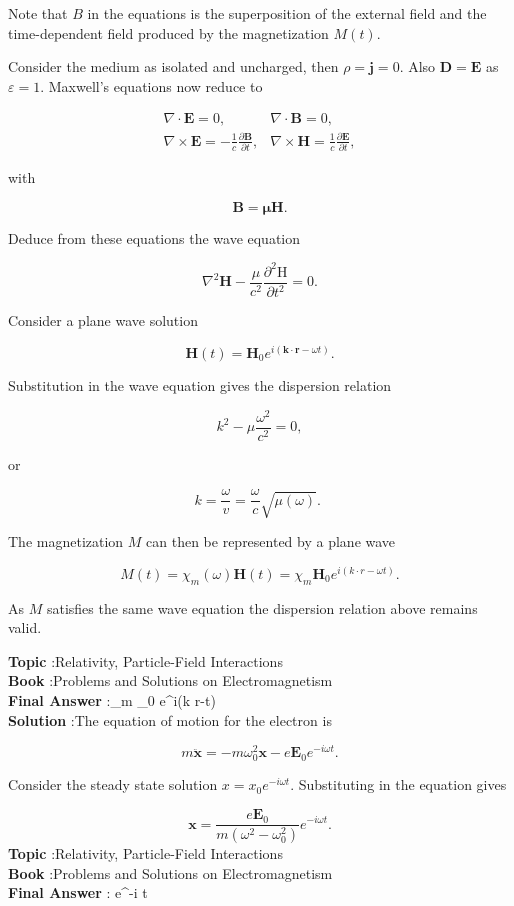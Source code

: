 \documentclass[10pt]{article}
\begin{document}
Note that $B$ in the equations is the superposition of the external field and the time-dependent field produced by the magnetization $M(t)$.

Consider the medium as isolated and uncharged, then $\rho=\mathbf{j}=0$. Also $\mathbf{D}=\mathbf{E}$ as $\varepsilon=1$. Maxwell's equations now reduce to

$$
\begin{array}{ll}
\nabla \cdot \mathbf{E}=0, & \nabla \cdot \mathbf{B}=0, \\
\nabla \times \mathbf{E}=-\frac{1}{c} \frac{\partial \mathbf{B}}{\partial t}, & \nabla \times \mathbf{H}=\frac{1}{c} \frac{\partial \mathbf{E}}{\partial t},
\end{array}
$$

with

$$
\mathbf{B}=\boldsymbol{\mu} \mathbf{H} .
$$

Deduce from these equations the wave equation

$$
\nabla^{2} \mathbf{H}-\frac{\mu}{c^{2}} \frac{\partial^{2} \mathrm{H}}{\partial t^{2}}=0 .
$$

Consider a plane wave solution

$$
\mathbf{H}(t)=\mathbf{H}_{0} e^{i(\mathbf{k} \cdot \mathbf{r}-\omega t)} .
$$

Substitution in the wave equation gives the dispersion relation

$$
k^{2}-\mu \frac{\omega^{2}}{c^{2}}=0,
$$

or

$$
k=\frac{\omega}{v}=\frac{\omega}{c} \sqrt{\mu(\omega)} \text {. }
$$

The magnetization $M$ can then be represented by a plane wave

$$
M(t)=\chi_{m}(\omega) \mathbf{H}(t)=\chi_{m} \mathbf{H}_{0} e^{i(k \cdot r-\omega t)} .
$$

As $M$ satisfies the same wave equation the dispersion relation above remains valid.

\textbf{Topic} :Relativity, Particle-Field Interactions\\
\textbf{Book} :Problems and Solutions on Electromagnetism\\
\textbf{Final Answer} :\chi_{m} _{0} e^{i(k \cdot r-\omega t)}\\


\textbf{Solution} :The equation of motion for the electron is

$$
m \ddot{\mathbf{x}}=-m \omega_{0}^{2} \mathbf{x}-e \mathbf{E}_{0} e^{-i \omega t} .
$$

Consider the steady state solution $x=x_{0} e^{-i \omega t}$. Substituting in the equation gives

$$
\mathbf{x}=\frac{e \mathbf{E}_{0}}{m\left(\omega^{2}-\omega_{0}^{2}\right)} e^{-i \omega t} .
$$
\textbf{Topic} :Relativity, Particle-Field Interactions\\
\textbf{Book} :Problems and Solutions on Electromagnetism\\
\textbf{Final Answer} : e^{-i \omega t}\\
\end{document}

